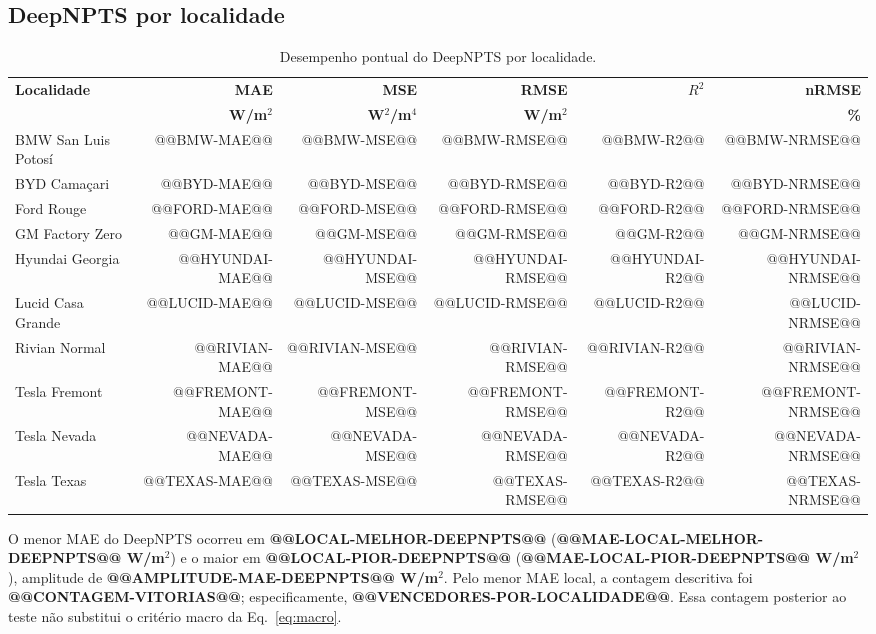 \documentclass[10pt,conference,a4paper]{IEEEtran}
\begin{document}
\subsection{DeepNPTS por localidade}

\begin{table}[!t]
\centering
\caption{Desempenho pontual do DeepNPTS por localidade.}
\label{tab:deepnpts_local}
\scriptsize
\setlength{\tabcolsep}{4.5pt}
\renewcommand{\arraystretch}{1.02}
\begin{tabular}{lrrrrr}
\toprule
\textbf{Localidade} & \textbf{MAE} & \textbf{MSE} & \textbf{RMSE} & \textbf{$R^2$} & \textbf{nRMSE} \\
 & \textbf{W/m$^2$} & \textbf{W$^2$/m$^4$} & \textbf{W/m$^2$} & & \textbf{\%} \\
\midrule
BMW San Luis Potosí & @@BMW-MAE@@ & @@BMW-MSE@@ & @@BMW-RMSE@@ & @@BMW-R2@@ & @@BMW-NRMSE@@ \\
BYD Camaçari        & @@BYD-MAE@@ & @@BYD-MSE@@ & @@BYD-RMSE@@ & @@BYD-R2@@ & @@BYD-NRMSE@@ \\
Ford Rouge          & @@FORD-MAE@@ & @@FORD-MSE@@ & @@FORD-RMSE@@ & @@FORD-R2@@ & @@FORD-NRMSE@@ \\
GM Factory Zero     & @@GM-MAE@@ & @@GM-MSE@@ & @@GM-RMSE@@ & @@GM-R2@@ & @@GM-NRMSE@@ \\
Hyundai Georgia     & @@HYUNDAI-MAE@@ & @@HYUNDAI-MSE@@ & @@HYUNDAI-RMSE@@ & @@HYUNDAI-R2@@ & @@HYUNDAI-NRMSE@@ \\
Lucid Casa Grande   & @@LUCID-MAE@@ & @@LUCID-MSE@@ & @@LUCID-RMSE@@ & @@LUCID-R2@@ & @@LUCID-NRMSE@@ \\
Rivian Normal       & @@RIVIAN-MAE@@ & @@RIVIAN-MSE@@ & @@RIVIAN-RMSE@@ & @@RIVIAN-R2@@ & @@RIVIAN-NRMSE@@ \\
Tesla Fremont       & @@FREMONT-MAE@@ & @@FREMONT-MSE@@ & @@FREMONT-RMSE@@ & @@FREMONT-R2@@ & @@FREMONT-NRMSE@@ \\
Tesla Nevada        & @@NEVADA-MAE@@ & @@NEVADA-MSE@@ & @@NEVADA-RMSE@@ & @@NEVADA-R2@@ & @@NEVADA-NRMSE@@ \\
Tesla Texas         & @@TEXAS-MAE@@ & @@TEXAS-MSE@@ & @@TEXAS-RMSE@@ & @@TEXAS-R2@@ & @@TEXAS-NRMSE@@ \\
\bottomrule
\end{tabular}
\end{table}

O menor MAE do DeepNPTS ocorreu em \textbf{@@LOCAL-MELHOR-DEEPNPTS@@}
(\textbf{@@MAE-LOCAL-MELHOR-DEEPNPTS@@ W/m$^2$}) e o maior em
\textbf{@@LOCAL-PIOR-DEEPNPTS@@}
(\textbf{@@MAE-LOCAL-PIOR-DEEPNPTS@@ W/m$^2$}), amplitude de
\textbf{@@AMPLITUDE-MAE-DEEPNPTS@@ W/m$^2$}. Pelo menor MAE local, a contagem
descritiva foi \textbf{@@CONTAGEM-VITORIAS@@}; especificamente,
\textbf{@@VENCEDORES-POR-LOCALIDADE@@}. Essa contagem posterior ao teste não
substitui o critério macro da Eq.~\eqref{eq:macro}.
\end{document}
